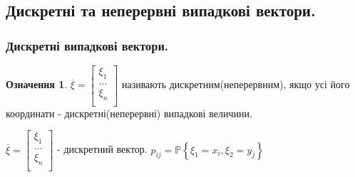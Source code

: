 \documentclass[14pt,a4paper]{scrartcl}
\theoremstyle{definition}
\newtheorem*{defo}{Означення}
\theoremstyle{remark}
\theoremstyle{definition}
\theoremstyle{definition}
\begin{document}
\subsection{Дискретні та неперервні випадкові вектори.}
\subsubsection{Дискретні випадкові вектори.}
\begin{defo}
	$ \overline{\xi} = \begin{bmatrix}
	  \xi_1 \\
	...\\
	\xi_n\\
	\end{bmatrix}$ називають дискретним(неперервним), якщо усі його координати - дискретні(неперервні) випадкові величини.
\end{defo}
$
\overline{\xi} = \begin{bmatrix}
	\xi_1 \\
...\\
\xi_n\\
\end{bmatrix}
$ - дискретний вектор.
$p_{ij} = \mathbb{P} \left\lbrace \xi_1 = x_i , \xi_2= y_j \right\rbrace
\qquad $
\end{document}

